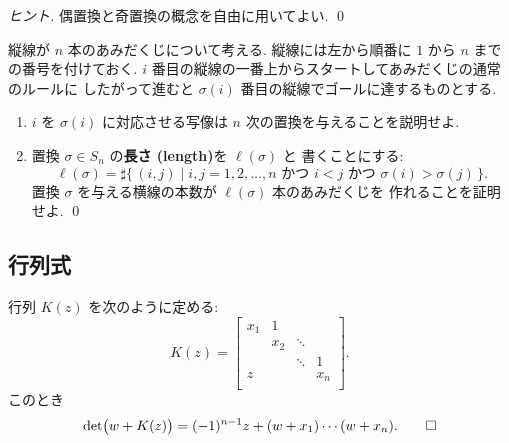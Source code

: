 \documentclass[12pt,twoside]{jarticle}
\begin{document}
\begin{proof}[ヒント]
  偶置換と奇置換の概念を自由に用いてよい.
  \qed
\end{proof}

\begin{question}[20点]
  縦線が $n$ 本のあみだくじについて考える.
  縦線には左から順番に $1$ から $n$ までの番号を付けておく.
  $i$ 番目の縦線の一番上からスタートしてあみだくじの通常のルールに
  したがって進むと $\sigma(i)$ 番目の縦線でゴールに達するものとする.
  \begin{enumerate}
  \item 
    $i$ を $\sigma(i)$ に対応させる写像は $n$ 次の置換を与えることを説明せよ.
  \item
    置換 $\sigma\in S_n$ の{\bf 長さ (length)}を $\ell(\sigma)$ と
    書くことにする:
    \begin{equation*}
      \ell(\sigma) 
      = \sharp
        \{\, (i,j) \mid 
        \text{$i,j=1,2,\ldots,n$ かつ $i<j$ かつ $\sigma(i)>\sigma(j)$}
        \,\}.
    \end{equation*}
    置換 $\sigma$ を与える横線の本数が $\ell(\sigma)$ 本のあみだくじを
    作れることを証明せよ.
    \qed
  \end{enumerate}
\end{question}  


\subsection{行列式}

\begin{question}[10点]
  \label{q:det-(1,n)-model}
  行列 $K(z)$ を次のように定める:
  \begin{equation*}
    K(z) = 
    \begin{bmatrix}
      x_1 & 1   & & \\
          & x_2 & \ddots & \\
          &     & \ddots & 1 \\
      z   &     &        & x_n \\
    \end{bmatrix}.
  \end{equation*}
  このとき
  \begin{equation*}
    \det\bigl( w + K(z) \bigr)
    = (-1)^{n-1}z + (w+x_1)\cdots(w+x_n).
    \qed
  \end{equation*}
\end{question}
\end{document}
